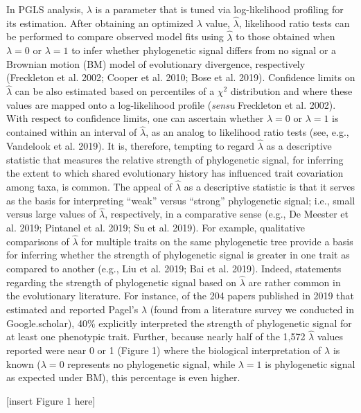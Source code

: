 \documentclass[]{article}
\begin{document}
In PGLS analysis, \(\lambda\) is a parameter that is tuned via
log-likelihood profiling for its estimation. After obtaining an
optimized \(\lambda\) value, \(\hat{\lambda}\), likelihood ratio tests
can be performed to compare observed model fits using \(\hat{\lambda}\)
to those obtained when \(\lambda=0\) or \(\lambda=1\) to infer whether
phylogenetic signal differs from no signal or a Brownian motion (BM)
model of evolutionary divergence, respectively (Freckleton et al. 2002;
Cooper et al. 2010; Bose et al. 2019). Confidence limits on
\(\hat{\lambda}\) can be also estimated based on percentiles of a
\(\chi^2\) distribution and where these values are mapped onto a
log-likelihood profile (\emph{sensu} Freckleton et al. 2002). With
respect to confidence limits, one can ascertain whether \(\lambda=0\) or
\(\lambda=1\) is contained within an interval of \(\hat{\lambda}\), as
an analog to likelihood ratio tests (see, e.g., Vandelook et al. 2019).
It is, therefore, tempting to regard \(\hat{\lambda}\) as a descriptive
statistic that measures the relative strength of phylogenetic signal,
for inferring the extent to which shared evolutionary history has
influenced trait covariation among taxa, is common. The appeal of
\(\hat{\lambda}\) as a descriptive statistic is that it serves as the
basis for interpreting ``weak'' versus ``strong'' phylogenetic signal;
i.e., small versus large values of \(\hat{\lambda}\), respectively, in a
comparative sense (e.g., De Meester et al. 2019; Pintanel et al. 2019;
Su et al. 2019). For example, qualitative comparisons of
\(\hat{\lambda}\) for multiple traits on the same phylogenetic tree
provide a basis for inferring whether the strength of phylogenetic
signal is greater in one trait as compared to another (e.g., Liu et al.
2019; Bai et al. 2019). Indeed, statements regarding the strength of
phylogenetic signal based on \(\hat{\lambda}\) are rather common in the
evolutionary literature. For instance, of the 204 papers published in
2019 that estimated and reported Pagel's \(\lambda\) (found from a
literature survey we conducted in Google.scholar), 40\% explicitly
interpreted the strength of phylogenetic signal for at least one
phenotypic trait. Further, because nearly half of the 1,572
\(\hat{\lambda}\) values reported were near 0 or 1 (Figure 1) where the
biological interpretation of \(\lambda\) is known (\(\lambda=0\)
represents no phylogenetic signal, while \(\lambda=1\) is phylogenetic
signal as expected under BM), this percentage is even higher.
\hfill\break

{[}insert Figure 1 here{]} \hfill\break
\end{document}
